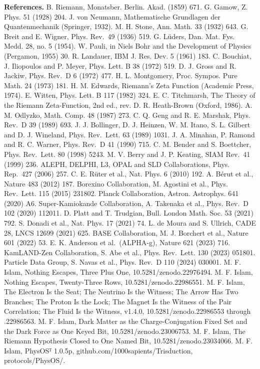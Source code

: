 \documentclass[10pt]{article}
\begin{document}
\textbf{References.} B. Riemann, Monatsber. Berlin. Akad. (1859) 671. G.
Gamow, Z. Phys. 51 (1928) 204. J. von Neumann, Mathematische Grundlagen
der Quantenmechanik (Springer, 1932). M. H. Stone, Ann. Math. 33 (1932)
643. G. Breit and E. Wigner, Phys. Rev.~49 (1936) 519. G. Lüders, Dan.
Mat. Fys. Medd. 28, no. 5 (1954). W. Pauli, in Niels Bohr and the
Development of Physics (Pergamon, 1955) 30. R. Landauer, IBM J. Res.
Dev. 5 (1961) 183. C. Bouchiat, J. Iliopoulos and P. Meyer, Phys. Lett.
B 38 (1972) 519. D. J. Gross and R. Jackiw, Phys. Rev.~D 6 (1972) 477.
H. L. Montgomery, Proc. Sympos. Pure Math. 24 (1973) 181. H. M. Edwards,
Riemann's Zeta Function (Academic Press, 1974). E. Witten, Phys. Lett. B
117 (1982) 324. E. C. Titchmarsh, The Theory of the Riemann
Zeta-Function, 2nd ed., rev. D. R. Heath-Brown (Oxford, 1986). A. M.
Odlyzko, Math. Comp. 48 (1987) 273. C. Q. Geng and R. E. Marshak, Phys.
Rev.~D 39 (1989) 693. J. J. Bollinger, D. J. Heinzen, W. M. Itano, S. L.
Gilbert and D. J. Wineland, Phys. Rev.~Lett. 63 (1989) 1031. J. A.
Minahan, P. Ramond and R. C. Warner, Phys. Rev.~D 41 (1990) 715. C. M.
Bender and S. Boettcher, Phys. Rev.~Lett. 80 (1998) 5243. M. V. Berry
and J. P. Keating, SIAM Rev.~41 (1999) 236. ALEPH, DELPHI, L3, OPAL and
SLD Collaborations, Phys. Rep.~427 (2006) 257. C. E. Rüter et al., Nat.
Phys. 6 (2010) 192. A. Bérut et al., Nature 483 (2012) 187. Borexino
Collaboration, M. Agostini et al., Phys. Rev.~Lett. 115 (2015) 231802.
Planck Collaboration, Astron. Astrophys. 641 (2020) A6. Super-Kamiokande
Collaboration, A. Takenaka et al., Phys. Rev.~D 102 (2020) 112011. D.
Platt and T. Trudgian, Bull. London Math. Soc. 53 (2021) 792. S. Donadi
et al., Nat. Phys. 17 (2021) 74. L. de Moura and S. Ullrich, CADE 28,
LNCS 12699 (2021) 625. BASE Collaboration, M. J. Borchert et al., Nature
601 (2022) 53. E. K. Anderson et al.~(ALPHA-g), Nature 621 (2023) 716.
KamLAND-Zen Collaboration, S. Abe et al., Phys. Rev.~Lett. 130 (2023)
051801. Particle Data Group, S. Navas et al., Phys. Rev.~D 110 (2024)
030001. M. F. Islam, Nothing Escapes, Three Plus One,
10.5281/\allowbreak{}zenodo.22976494. M. F. Islam, Nothing Escapes,
Twenty-Three Rows, 10.5281/\allowbreak{}zenodo.22986551. M. F. Islam,
The Electron Is the Seat; The Neutrino Is the Witness; The Arrow Has Two
Branches; The Proton Is the Lock; The Magnet Is the Witness of the Pair
Correlation; The Fluid Is the Witness, v1.4.0,
10.5281/\allowbreak{}zenodo.22986553 through .22986563. M. F. Islam,
Dark Matter as the Charge-Conjugation Fixed Set and the Dark Force as
One Keyed Bit, 10.5281/\allowbreak{}zenodo.23006753. M. F. Islam, The
Riemann Hypothesis Closed to One Named Bit,
10.5281/\allowbreak{}zenodo.23034066. M. F. Islam, PhysOSᵀ 1.0.5p,
github.com/\allowbreak{}1000sapients/\allowbreak{}Trisduction,
protocols/PhysOS/.
\end{document}

